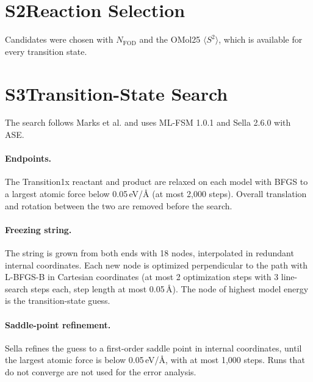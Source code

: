 
\section{S2\quad Reaction Selection}
Candidates were chosen with $N_\mathrm{FOD}$ and the OMol25 $\langle S^2\rangle$, which is available for every transition state.

\section{S3\quad Transition-State Search}
The search follows Marks et al.\cite{marks2026fsm} and uses ML-FSM 1.0.1\cite{marks2026fsm} and Sella 2.6.0\cite{hermes2022sella} with ASE.

\paragraph{Endpoints.} The Transition1x reactant and product are relaxed on each model with BFGS to a largest atomic force below 0.05\,eV/\AA{} (at most 2,000 steps). Overall translation and rotation between the two are removed before the search.

\paragraph{Freezing string.} The string is grown from both ends with 18 nodes, interpolated in redundant internal coordinates. Each new node is optimized perpendicular to the path with L-BFGS-B in Cartesian coordinates (at most 2 optimization steps with 3 line-search steps each, step length at most 0.05\,\AA). The node of highest model energy is the transition-state guess.

\paragraph{Saddle-point refinement.} Sella refines the guess to a first-order saddle point in internal coordinates, until the largest atomic force is below 0.05\,eV/\AA{}, with at most 1,000 steps. Runs that do not converge are not used for the error analysis.

